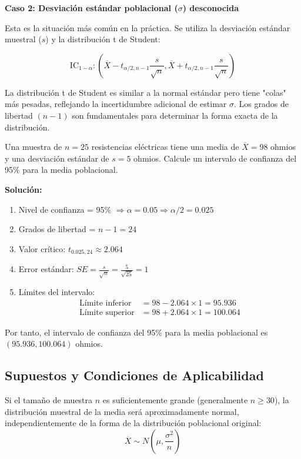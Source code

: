 \textbf{Caso 2: Desviación estándar poblacional ($\sigma$) desconocida}

Esta es la situación más común en la práctica. Se utiliza la desviación estándar muestral ($s$) y la distribución t de Student:

\[
\text{IC}_{1-\alpha}: \left( \overline{X} - t_{\alpha/2, n-1} \frac{s}{\sqrt{n}}, \overline{X} + t_{\alpha/2, n-1} \frac{s}{\sqrt{n}} \right)
\]

\begin{remark}
La distribución t de Student es similar a la normal estándar pero tiene "colas" más pesadas, reflejando la incertidumbre adicional de estimar $\sigma$. Los grados de libertad $(n-1)$ son fundamentales para determinar la forma exacta de la distribución.
\end{remark}

\begin{example}
Una muestra de $n=25$ resistencias eléctricas tiene una media de $\overline{X} = 98$ ohmios y una desviación estándar de $s = 5$ ohmios. Calcule un intervalo de confianza del 95\% para la media poblacional.

\textbf{Solución:}
\begin{enumerate}
\item Nivel de confianza = 95\% $\Rightarrow \alpha = 0.05 \Rightarrow \alpha/2 = 0.025$
\item Grados de libertad = $n-1 = 24$
\item Valor crítico: $t_{0.025,24} \approx 2.064$
\item Error estándar: $SE = \frac{s}{\sqrt{n}} = \frac{5}{\sqrt{25}} = 1$
\item Límites del intervalo:
   \begin{align}
   \text{Límite inferior} &= 98 - 2.064 \times 1 = 95.936\\
   \text{Límite superior} &= 98 + 2.064 \times 1 = 100.064
   \end{align}
\end{enumerate}

Por tanto, el intervalo de confianza del 95\% para la media poblacional es $(95.936, 100.064)$ ohmios.
\end{example}

\subsection{Supuestos y Condiciones de Aplicabilidad}

\begin{theorem}
Si el tamaño de muestra $n$ es suficientemente grande (generalmente $n \geq 30$), la distribución muestral de la media será aproximadamente normal, independientemente de la forma de la distribución poblacional original:
\[
\overline{X} \sim N\left(\mu, \frac{\sigma^2}{n}\right)
\]
\end{theorem}

